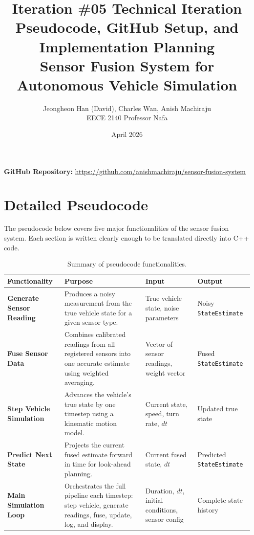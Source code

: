 \documentclass[a4paper,11pt]{article}
\title{\textbf{Iteration \#05   Technical Iteration} \\ \large Pseudocode, GitHub Setup, and Implementation Planning \\ \bigskip \normalsize Sensor Fusion System for Autonomous Vehicle Simulation}
\author{Jeongheon Han (David), Charles Wan, Anish Machiraju \\ EECE 2140   Professor Nafa}
\date{April 2026}
\begin{document}
\maketitle

\noindent\textbf{GitHub Repository:} \url{https://github.com/anishmachiraju/sensor-fusion-system}

\section{Detailed Pseudocode}

The pseudocode below covers five major functionalities of the sensor fusion system. Each section is written clearly enough to be translated directly into C++ code.

\begin{table}[H]
\centering
\small
\renewcommand{\arraystretch}{1.35}
\begin{tabularx}{\textwidth}{>{\bfseries}p{3cm} X p{3.2cm} p{3.2cm}}
\toprule
Functionality & Purpose & Input & Output \\
\midrule
Generate Sensor Reading &
Produces a noisy measurement from the true vehicle state for a given sensor type. &
True vehicle state, noise parameters &
Noisy \texttt{StateEstimate} \\
\addlinespace
Fuse Sensor Data &
Combines calibrated readings from all registered sensors into one accurate estimate using weighted averaging. &
Vector of sensor readings, weight vector &
Fused \texttt{StateEstimate} \\
\addlinespace
Step Vehicle Simulation &
Advances the vehicle's true state by one timestep using a kinematic motion model. &
Current state, speed, turn rate, $dt$ &
Updated true state \\
\addlinespace
Predict Next State &
Projects the current fused estimate forward in time for look-ahead planning. &
Current fused state, $dt$ &
Predicted \texttt{StateEstimate} \\
\addlinespace
Main Simulation Loop &
Orchestrates the full pipeline each timestep: step vehicle, generate readings, fuse, update, log, and display. &
Duration, $dt$, initial conditions, sensor config &
Complete state history \\
\bottomrule
\end{tabularx}
\caption{Summary of pseudocode functionalities.}
\end{table}
\end{document}

